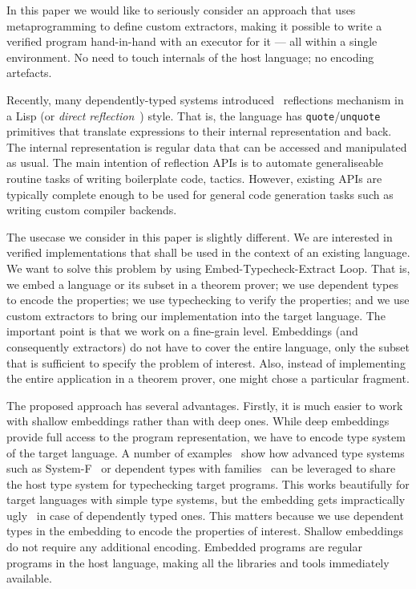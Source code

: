 \documentclass[acmsmall,review,anonymous]{acmart}\settopmatter{printfolios=true,printccs=false,printacmref=false}
\begin{document}
In this paper we would like to seriously consider an approach that
uses metaprogramming to define custom extractors, making it possible
to write a verified program hand-in-hand with an executor for it ---
all within a single environment.  No need to touch internals
of the host language; no encoding artefacts.

Recently, many dependently-typed systems introduced~\cite{idris-refl,
lean-refl,metacoq,agda-refl} reflections
mechanism in a Lisp (or \emph{direct reflection}~\cite{nuprl-refl})
style.  That is, the language has \texttt{quote}/\texttt{unquote}
primitives that translate expressions to their internal representation
and back.  The internal representation is regular data that can be
accessed and manipulated as usual.  The main intention of
reflection APIs is to automate generaliseable routine tasks of writing
boilerplate code, \eg{} tactics.  However, existing APIs are
typically complete enough to be used for general
code generation tasks such as writing custom compiler backends.

The usecase we consider in this paper is slightly different.
We are interested in verified implementations that shall be used
in the context of an existing language.  We want to solve this
problem by using Embed-Typecheck-Extract Loop.  That is, we embed
a language or its subset in a theorem prover; we use dependent types
to encode the properties; we use typechecking to verify the properties;
and we use custom extractors to bring our implementation into the
target language.  The important point is that we work
on a fine-grain level.  Embeddings (and consequently extractors) do
not have to cover the entire language, only the subset that is
sufficient to specify the problem of interest.  Also, instead of
implementing the entire application in a theorem prover, one might chose
a particular fragment.

The proposed approach has several advantages.  Firstly, it is much easier
to work with shallow embeddings rather than with deep ones.  While deep
embeddings provide full access to the program representation, we have
to encode type system of the target language.  A number of examples~\cite{}
show how advanced type systems such as System-F~\cite{} or dependent
types with families~\cite{} can be leveraged to share the host type
system for typechecking target programs.  This works beautifully for
target languages with simple type systems, but the embedding gets
impractically ugly~\cite{} in case of dependently typed ones.  This
matters because we use dependent types in the embedding to encode the
properties of interest.  Shallow embeddings do not require any additional
encoding.  Embedded programs are regular programs in the host language,
making all the libraries and tools immediately available.
\end{document}
